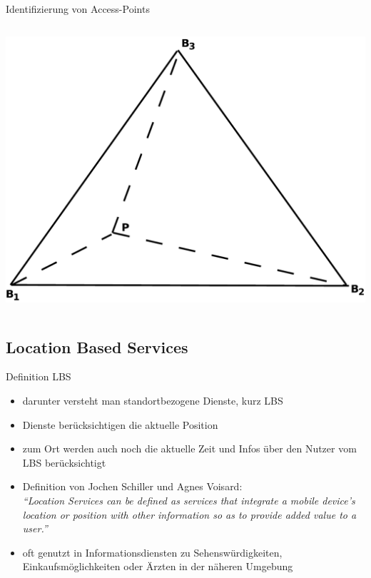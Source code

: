 \begin{frame}{Identifizierung von Access-Points}
\begin{columns}
\begin{column}{.45\textwidth}
\begin{center}
    \hspace{.5cm}\includegraphics[scale=.2]{images/Diagram1.pdf}
  \end{center}
  \end{column}
  \end{columns}
\end{frame}

\subsection{Location Based Services}
\begin{frame}{Definition LBS}
\begin{itemize}
  \item darunter versteht man standortbezogene Dienste, kurz LBS
  \item Dienste berücksichtigen die aktuelle Position
  \item zum Ort werden auch noch die aktuelle Zeit und Infos über den Nutzer vom LBS berücksichtigt
  \item Definition von Jochen Schiller und Agnes Voisard:\\ \vspace{.5cm}
  \textit{"`Location Services can be defined as services that integrate a mobile device’s location or position with other information so as to provide added value to a user."'}
  \vspace{.5cm}
  \item oft genutzt in Informationsdiensten zu Sehenswürdigkeiten, Einkaufsmöglichkeiten oder Ärzten in der näheren Umgebung
\end{itemize}
\end{frame}


